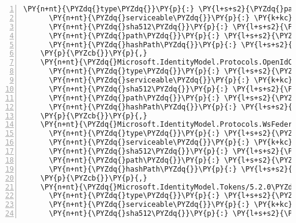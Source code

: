 \begin{Verbatim}[commandchars=\\\{\},numbers=left,firstnumber=1,stepnumber=1,numberblanklines=0]
      \PY{n+nt}{\PYZdq{}type\PYZdq{}}\PY{p}{:} \PY{l+s+s2}{\PYZdq{}package\PYZdq{}}\PY{p}{,}
      \PY{n+nt}{\PYZdq{}serviceable\PYZdq{}}\PY{p}{:} \PY{k+kc}{true}\PY{p}{,}
      \PY{n+nt}{\PYZdq{}sha512\PYZdq{}}\PY{p}{:} \PY{l+s+s2}{\PYZdq{}sha512\PYZhy{}pakGqbE3FRort3vb0qqWI0Qfy84IOXs8sG7ygANUpoRT+544svQ62JfvCX4UPnqf5bCUpSxVc3rDh8yCQBtc7w==\PYZdq{}}\PY{p}{,}
      \PY{n+nt}{\PYZdq{}path\PYZdq{}}\PY{p}{:} \PY{l+s+s2}{\PYZdq{}microsoft.identitymodel.protocols/5.2.0\PYZdq{}}\PY{p}{,}
      \PY{n+nt}{\PYZdq{}hashPath\PYZdq{}}\PY{p}{:} \PY{l+s+s2}{\PYZdq{}microsoft.identitymodel.protocols.5.2.0.nupkg.sha512\PYZdq{}}
    \PY{p}{\PYZcb{}}\PY{p}{,}
    \PY{n+nt}{\PYZdq{}Microsoft.IdentityModel.Protocols.OpenIdConnect/5.2.0\PYZdq{}}\PY{p}{:} \PY{p}{\PYZob{}}
      \PY{n+nt}{\PYZdq{}type\PYZdq{}}\PY{p}{:} \PY{l+s+s2}{\PYZdq{}package\PYZdq{}}\PY{p}{,}
      \PY{n+nt}{\PYZdq{}serviceable\PYZdq{}}\PY{p}{:} \PY{k+kc}{true}\PY{p}{,}
      \PY{n+nt}{\PYZdq{}sha512\PYZdq{}}\PY{p}{:} \PY{l+s+s2}{\PYZdq{}sha512\PYZhy{}hMjsfdvgI/Gk/HWPgyVnju6fy3iULralgn1XU6eL17KkkFN2rJ1fDzJX3RKrjr888Y5S+hTSQAUcGzb4Fe3aBA==\PYZdq{}}\PY{p}{,}
      \PY{n+nt}{\PYZdq{}path\PYZdq{}}\PY{p}{:} \PY{l+s+s2}{\PYZdq{}microsoft.identitymodel.protocols.openidconnect/5.2.0\PYZdq{}}\PY{p}{,}
      \PY{n+nt}{\PYZdq{}hashPath\PYZdq{}}\PY{p}{:} \PY{l+s+s2}{\PYZdq{}microsoft.identitymodel.protocols.openidconnect.5.2.0.nupkg.sha512\PYZdq{}}
    \PY{p}{\PYZcb{}}\PY{p}{,}
    \PY{n+nt}{\PYZdq{}Microsoft.IdentityModel.Protocols.WsFederation/5.2.0\PYZdq{}}\PY{p}{:} \PY{p}{\PYZob{}}
      \PY{n+nt}{\PYZdq{}type\PYZdq{}}\PY{p}{:} \PY{l+s+s2}{\PYZdq{}package\PYZdq{}}\PY{p}{,}
      \PY{n+nt}{\PYZdq{}serviceable\PYZdq{}}\PY{p}{:} \PY{k+kc}{true}\PY{p}{,}
      \PY{n+nt}{\PYZdq{}sha512\PYZdq{}}\PY{p}{:} \PY{l+s+s2}{\PYZdq{}sha512\PYZhy{}7yohKgLzTObwy+Yq/WNshe2ar+9MZJischkn+L+IIQhpZCKWixr0QFR0V/1TzvGVeXBR/AJY/luZRLx84RlzJw==\PYZdq{}}\PY{p}{,}
      \PY{n+nt}{\PYZdq{}path\PYZdq{}}\PY{p}{:} \PY{l+s+s2}{\PYZdq{}microsoft.identitymodel.protocols.wsfederation/5.2.0\PYZdq{}}\PY{p}{,}
      \PY{n+nt}{\PYZdq{}hashPath\PYZdq{}}\PY{p}{:} \PY{l+s+s2}{\PYZdq{}microsoft.identitymodel.protocols.wsfederation.5.2.0.nupkg.sha512\PYZdq{}}
    \PY{p}{\PYZcb{}}\PY{p}{,}
    \PY{n+nt}{\PYZdq{}Microsoft.IdentityModel.Tokens/5.2.0\PYZdq{}}\PY{p}{:} \PY{p}{\PYZob{}}
      \PY{n+nt}{\PYZdq{}type\PYZdq{}}\PY{p}{:} \PY{l+s+s2}{\PYZdq{}package\PYZdq{}}\PY{p}{,}
      \PY{n+nt}{\PYZdq{}serviceable\PYZdq{}}\PY{p}{:} \PY{k+kc}{true}\PY{p}{,}
      \PY{n+nt}{\PYZdq{}sha512\PYZdq{}}\PY{p}{:} \PY{l+s+s2}{\PYZdq{}sha512\PYZhy{}Uz1Dk5Gw/jgIHEzac9cXhq7pH0Hf5P73vf23hR6QJn0IamLbPG4qoHnGyPMn9qQXc+jDb/j3fWOhvWGrteJXtA==\PYZdq{}}\PY{p}{,}

\end{Verbatim}
